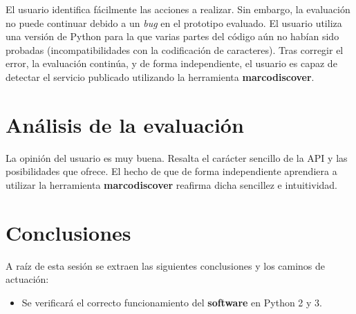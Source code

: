 El usuario identifica fácilmente las acciones a realizar. Sin embargo, la evaluación no puede continuar debido a un \textit{bug} en el prototipo evaluado. El usuario utiliza una versión de Python para la que varias partes del código aún no habían sido probadas (incompatibilidades con la codificación de caracteres). Tras corregir el error, la evaluación continúa, y de forma independiente, el usuario es capaz de detectar el servicio publicado utilizando la herramienta \textbf{marcodiscover}.

\section{Análisis de la evaluación}

La opinión del usuario es muy buena. Resalta el carácter sencillo de la API y las posibilidades que ofrece. El hecho de que de forma independiente aprendiera a utilizar la herramienta \textbf{marcodiscover} reafirma dicha sencillez e intuitividad.

\section{Conclusiones}

A raíz de esta sesión se extraen las siguientes conclusiones y los caminos de actuación:

\begin{itemize}
\item Se verificará el correcto funcionamiento del \textbf{software} en Python 2 y 3.
\end{itemize}



